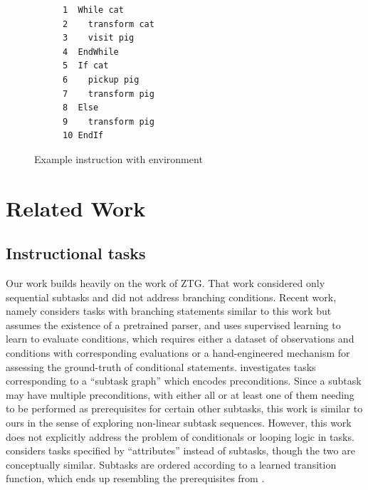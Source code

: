 \documentclass{article}
\begin{document}
\begin{figure}[t]
\vskip 0.2in
  \centering
  \begin{subfigure}{.2\columnwidth}
    \centering
  \end{subfigure}%
  \hfill
  \begin{subfigure}{.45\columnwidth}
    \centering
\begin{lstlisting}[]
1  While cat
2    transform cat
3    visit pig
4  EndWhile
5  If cat
6    pickup pig
7    transform pig
8  Else
9    transform pig
10 EndIf
\end{lstlisting}
  \end{subfigure}%
  \hfill
  \caption{Example instruction with environment}
\vskip -0.4in
\end{figure}

\section{Related Work}
\subsection{Instructional tasks}
Our work builds heavily on the work of ZTG. That work considered
only sequential subtasks and did not address branching conditions. Recent work,
namely \cite{sun2020program} considers tasks with branching statements similar
to this work but assumes the existence of a pretrained parser, and uses
supervised learning to learn to evaluate conditions, which requires either a
dataset of observations and conditions with corresponding evaluations or a
hand-engineered mechanism for assessing the ground-truth of conditional
statements. \cite{sohn2018hierarchical} investigates tasks corresponding to a
``subtask graph'' which encodes preconditions. Since a subtask may have multiple
preconditions, with either all or at least one of them needing to be performed
as prerequisites for certain other subtasks, this work is similar to ours in the
sense of exploring non-linear subtask sequences. However, this work does not
explicitly address the problem of conditionals or looping logic in tasks.
\cite{zhang2018composable} considers tasks specified by ``attributes'' instead
of subtasks, though the two are conceptually similar. Subtasks are ordered
according to a learned transition function, which ends up resembling the
prerequisites from \cite{sohn2018hierarchical}. 
\end{document}
